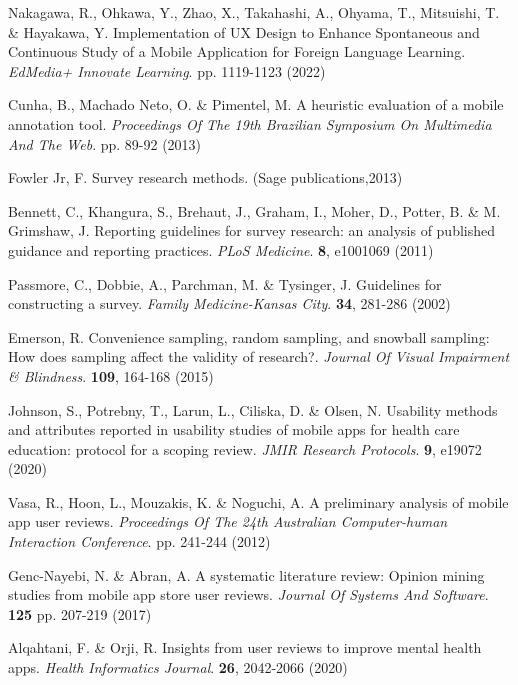 \documentclass[preprint,12pt]{elsarticle}
\begin{document}
\begin{thebibliography}{99}
Nakagawa, R., Ohkawa, Y., Zhao, X., Takahashi, A., Ohyama, T., Mitsuishi, T. \& Hayakawa, Y. Implementation of UX Design to Enhance Spontaneous and Continuous Study of a Mobile Application for Foreign Language Learning. {\em EdMedia+ Innovate Learning}. pp. 1119-1123 (2022)

Cunha, B., Machado Neto, O. \& Pimentel, M. A heuristic evaluation of a mobile annotation tool. {\em Proceedings Of The 19th Brazilian Symposium On Multimedia And The Web}. pp. 89-92 (2013)

Fowler Jr, F. Survey research methods. (Sage publications,2013)

Bennett, C., Khangura, S., Brehaut, J., Graham, I., Moher, D., Potter, B. \& M. Grimshaw, J. Reporting guidelines for survey research: an analysis of published guidance and reporting practices. {\em PLoS Medicine}. \textbf{8}, e1001069 (2011)

Passmore, C., Dobbie, A., Parchman, M. \& Tysinger, J. Guidelines for constructing a survey. {\em Family Medicine-Kansas City}. \textbf{34}, 281-286 (2002)

Emerson, R. Convenience sampling, random sampling, and snowball sampling: How does sampling affect the validity of research?. {\em Journal Of Visual Impairment \& Blindness}. \textbf{109}, 164-168 (2015)

Johnson, S., Potrebny, T., Larun, L., Ciliska, D. \& Olsen, N. Usability methods and attributes reported in usability studies of mobile apps for health care education: protocol for a scoping review. {\em JMIR Research Protocols}. \textbf{9}, e19072 (2020)

Vasa, R., Hoon, L., Mouzakis, K. \& Noguchi, A. A preliminary analysis of mobile app user reviews. {\em Proceedings Of The 24th Australian Computer-human Interaction Conference}. pp. 241-244 (2012)

Genc-Nayebi, N. \& Abran, A. A systematic literature review: Opinion mining studies from mobile app store user reviews. {\em Journal Of Systems And Software}. \textbf{125} pp. 207-219 (2017)

Alqahtani, F. \& Orji, R. Insights from user reviews to improve mental health apps. {\em Health Informatics Journal}. \textbf{26}, 2042-2066 (2020)


\end{thebibliography}
\end{document}
